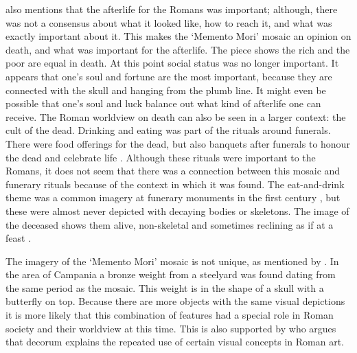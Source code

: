 	\textcite{Hope_2009} also mentions that the afterlife for the Romans was important; although, there was not a consensus about what it looked like, how to reach it, and what was exactly important about it. This makes the ‘Memento Mori’ mosaic an opinion on death, and what was important for the afterlife.
	The piece shows the rich and the poor are equal in death. At this point social status was no longer important. It appears that one’s soul and fortune are the most important, because they are connected with the skull and hanging from the plumb line. It might even be possible that one’s soul and luck balance out what kind of afterlife one can receive.
	The Roman worldview on death can also be seen in a larger context: the cult of the dead. Drinking and eating was part of the rituals around funerals. There were food offerings for the dead, but also banquets after funerals to honour the dead and celebrate life \parencite [121--123] {Erasmo_2012}. Although these rituals were important to the Romans, it does not seem that there was a connection between this mosaic and funerary rituals because of the context in which it was found. The eat-and-drink theme was a common imagery at funerary monuments in the first century \AD, but these were almost never depicted with decaying bodies or skeletons. The image of the deceased shows them alive, non-skeletal and sometimes reclining as if at a feast \parencite[38]{Hope_2009}.

The imagery of the ‘Memento Mori’ mosaic is not unique, as mentioned by \textcite[99--100] {Cuomo_2007}. 
In the area of Campania a bronze weight from a steelyard was found dating from the same period as the mosaic. This weight is in the shape of a skull with a butterfly on top. Because there are more objects with the same visual depictions it is more likely that this combination of features had a special role in Roman society and their worldview at this time. This is also supported by \textcite{Perry_2005}  who argues that decorum explains the repeated use of certain visual concepts in Roman art. 
	
